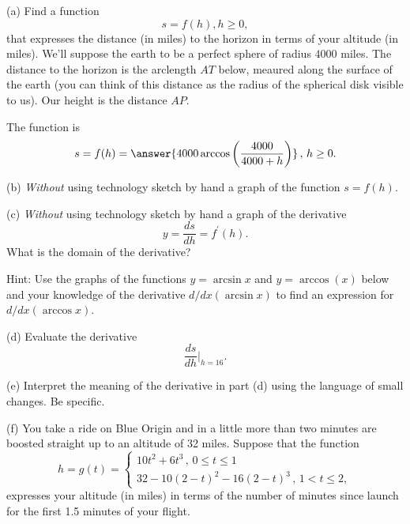 \documentclass{ximera}
\begin{document}
\begin{question}  \label{Q:LLKDKFG}
(a) Find a function
\[
     s = f(h) , h\geq 0 ,
\]
that expresses the distance (in miles) to the horizon in terms of your altitude (in miles). We'll suppose the earth to be a perfect sphere of radius $4000$ miles. The distance to the horizon is the arclength $AT$ below, meaured along the surface of the earth (you can think of this distance as the radius of the spherical disk visible to us). Our height is the distance $AP$. 
 
The function is 
\[
   s = f(h) = \answer{4000 \arccos\left( \frac{4000}{4000+h} \right) } \, , \, h \geq 0 .
\]

\begin{onlineOnly}
    \begin{center}
\end{center}
\end{onlineOnly}

(b) \emph{Without} using technology sketch by hand a graph of the function $s=f(h)$.

(c) \emph{Without} using technology sketch by hand a graph of the derivative
\[
   y = \frac{ds}{dh} = f^\prime(h) .
\] 
What is the domain of the derivative?

Hint: Use the graphs of the functions $y=\arcsin x$ and $y=\arccos(x)$ below and your knowledge of the derivative $d/dx(\arcsin x)$ to find an expression for $d/dx (\arccos x)$.

\begin{onlineOnly}
    \begin{center}
\end{center}
\end{onlineOnly}


(d) Evaluate the derivative 
\[
      \frac{ds}{dh}\Big|_{h=16} .
\]

(e) Interpret the meaning of the derivative in part (d) using the language of small changes. Be specific.

(f) You take a ride on Blue Origin and in a little more than two minutes are boosted straight up to an altitude of 32 miles. Suppose that the function
\[
      h = g(t) = 
\begin{cases}
10t^2 + 6t^3 \, , \, 0\leq t \leq 1  \\
32 - 10(2-t)^2 - 16(2-t)^3 \, , \, 1<t \leq 2 ,
\end{cases}
\]
expresses your altitude (in miles) in terms of the number of minutes since launch for the first 1.5 minutes of your flight.


\end{question}
\end{document}
